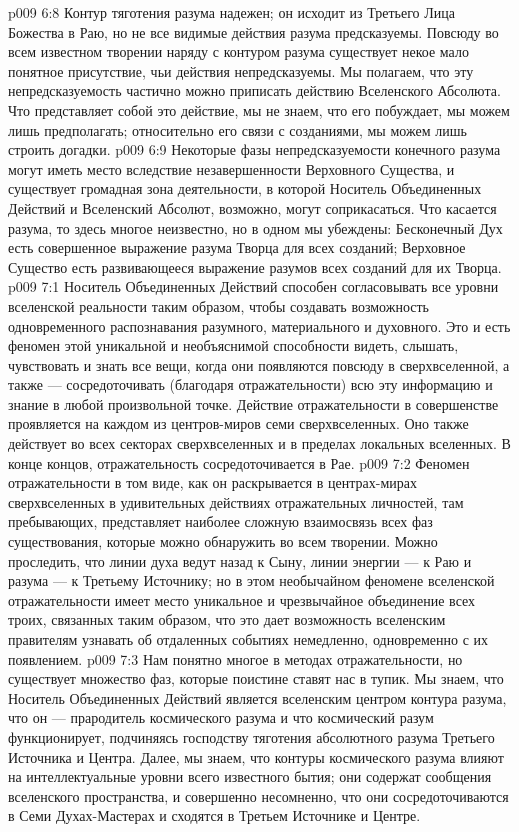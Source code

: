 \vs p009 6:8 \pc Контур тяготения разума надежен; он исходит из Третьего Лица Божества в Раю, но не все видимые действия разума предсказуемы. Повсюду во всем известном творении наряду с контуром разума существует некое мало понятное присутствие, чьи действия непредсказуемы. Мы полагаем, что эту непредсказуемость частично можно приписать действию Вселенского Абсолюта. Что представляет собой это действие, мы не знаем, что его побуждает, мы можем лишь предполагать; относительно его связи с созданиями, мы можем лишь строить догадки.
\vs p009 6:9 \pc Некоторые фазы непредсказуемости конечного разума могут иметь место вследствие незавершенности Верховного Существа, и существует громадная зона деятельности, в которой Носитель Объединенных Действий и Вселенский Абсолют, возможно, могут соприкасаться. Что касается разума, то здесь многое неизвестно, но в одном мы убеждены: Бесконечный Дух есть совершенное выражение разума Творца для всех созданий; Верховное Существо есть развивающееся выражение разумов всех созданий для их Творца.
\vs p009 7:1 Носитель Объединенных Действий способен согласовывать все уровни вселенской реальности таким образом, чтобы создавать возможность одновременного распознавания разумного, материального и духовного. Это и есть феномен  этой уникальной и необъяснимой способности видеть, слышать, чувствовать и знать все вещи, когда они появляются повсюду в сверхвселенной, а также --- сосредоточивать (благодаря отражательности) всю эту информацию и знание в любой произвольной точке. Действие отражательности в совершенстве проявляется на каждом из центров\hyp{}миров семи сверхвселенных. Оно также действует во всех секторах сверхвселенных и в пределах локальных вселенных. В конце концов, отражательность сосредоточивается в Рае.
\vs p009 7:2 Феномен отражательности в том виде, как он раскрывается в центрах\hyp{}мирах сверхвселенных в удивительных действиях отражательных личностей, там пребывающих, представляет наиболее сложную взаимосвязь всех фаз существования, которые можно обнаружить во всем творении. Можно проследить, что линии духа ведут назад к Сыну, линии энергии --- к Раю и разума --- к Третьему Источнику; но в этом необычайном феномене вселенской отражательности имеет место уникальное и чрезвычайное объединение всех троих, связанных таким образом, что это дает возможность вселенским правителям узнавать об отдаленных событиях немедленно, одновременно с их появлением.
\vs p009 7:3 Нам понятно многое в методах отражательности, но существует множество фаз, которые поистине ставят нас в тупик. Мы знаем, что Носитель Объединенных Действий является вселенским центром контура разума, что он --- прародитель космического разума и что космический разум функционирует, подчиняясь господству тяготения абсолютного разума Третьего Источника и Центра. Далее, мы знаем, что контуры космического разума влияют на интеллектуальные уровни всего известного бытия; они содержат сообщения вселенского пространства, и совершенно несомненно, что они сосредоточиваются в Семи Духах\hyp{}Мастерах и сходятся в Третьем Источнике и Центре.
